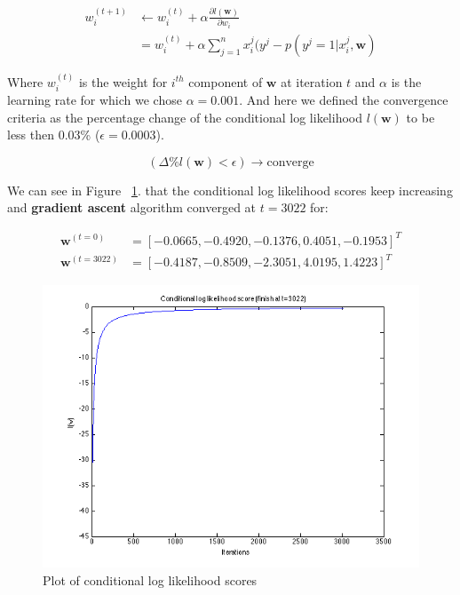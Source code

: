 \documentclass[a4paper]{article}
\begin{document}
	\begin{align}
		w_i^{(t+1)} &\leftarrow w_i^{(t)} + \alpha \frac{\partial l(\mathbf{w})}{\partial w_i} \\
			&= w_i^{(t)} + \alpha \sum_{j=1}^n x_i^j(y^j - p(y^j=1|x_i^j, \mathbf{w})
	\end{align}
	
	Where $w_i^{(t)}$ is the weight for $i^{th}$ component of $\mathbf{w}$ at iteration $t$ and $\alpha$ is the learning rate for which we chose $\alpha = 0.001$. And here we defined the convergence criteria as the percentage change of the conditional log likelihood $l(\mathbf{w})$ to be less then 0.03\% ($\epsilon = 0.0003$).
	
	\begin{equation}
		(\Delta \%l(\mathbf{w}) < \epsilon) \to \text{converge}
	\end{equation}
	
	We can see in Figure ~\ref{fig:gradient_ascent}. that the conditional log likelihood scores keep increasing and \textbf{gradient ascent} algorithm converged at $t=3022$ for:
	
	\begin{align}
		\mathbf{w}^{(t=0)} &= [-0.0665, -0.4920, -0.1376, 0.4051, -0.1953]^T \\ 
		\mathbf{w}^{(t=3022)} &= [-0.4187, -0.8509, -2.3051, 4.0195, 1.4223]^T
	\end{align}
	
	\begin{figure}[H]
		\centering
		\includegraphics[scale=.57]{images/gradient_ascent.png}
		\caption{Plot of conditional log likelihood scores}
		\label{fig:gradient_ascent}
	\end{figure}
	
\end{document}
